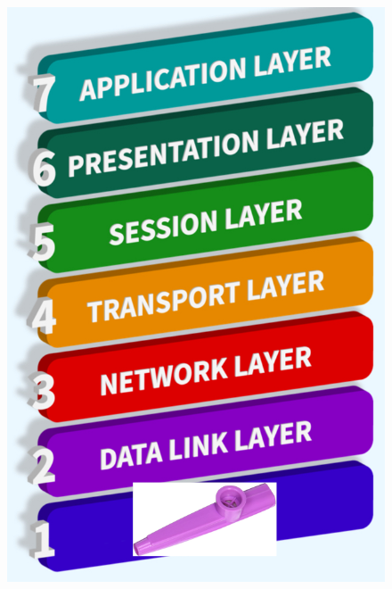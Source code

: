 \documentclass[
	11pt, %
]{beamer}
\begin{document}
\begin{frame}
\begin{columns}[c]
\begin{column}{0.4\textwidth}
\begin{center}
\begin{figure}
          \includegraphics[width=1\linewidth]{new_osi_model.png}
        \end{figure}
      \end{center}
    \end{column}
  \end{columns}

\end{frame}

\end{document}
